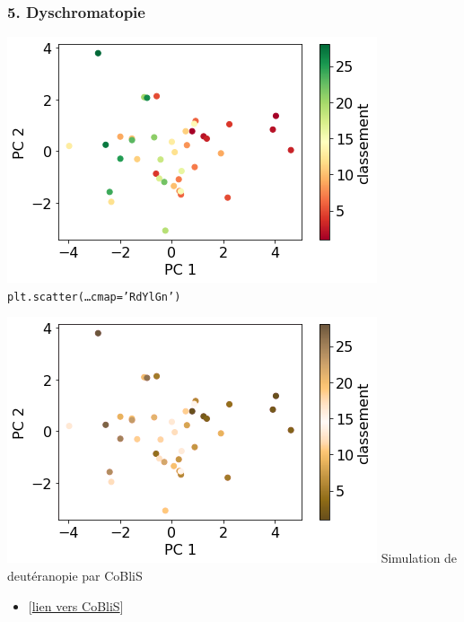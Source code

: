 \documentclass[sans,14pt]{beamer}
\begin{document}
{\begin{frame}
  \frametitle{5. Dyschromatopie}
  \begin{minipage}[h]{0.49\linewidth}
    \begin{center}
      \includegraphics[width=\textwidth]{figures/pca_plot_RdYlGn} \newline
      {\footnotesize{\texttt{plt.scatter(\dots cmap='RdYlGn')}}}
    \end{center}
  \end{minipage}%
  \pause
  \hfill
  \begin{minipage}[h]{0.49\linewidth}
    \begin{center}
      \includegraphics[width=\textwidth]{figures/pca_plot_RdYlGn_coblis} \newline
      {\footnotesize{Simulation de deutéranopie par CoBliS}}
      \end{center}
    \end{minipage}%
    \vspace{2em}
    \begin{itemize}
    \item[] \footnotesize \hfill [\href{https://www.color-blindness.com/coblis-color-blindness-simulator/}{lien vers CoBliS}]
    \end{itemize}
\end{frame}

}
\end{document}
